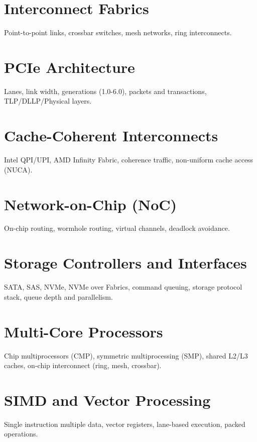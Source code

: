 \chapter{Interconnect Fabrics}
Point-to-point links, crossbar switches, mesh networks, ring interconnects.

\chapter{PCIe Architecture}
Lanes, link width, generations (1.0-6.0), packets and transactions, TLP/DLLP/Physical layers.

\chapter{Cache-Coherent Interconnects}
Intel QPI/UPI, AMD Infinity Fabric, coherence traffic, non-uniform cache access (NUCA).

\chapter{Network-on-Chip (NoC)}
On-chip routing, wormhole routing, virtual channels, deadlock avoidance.

\chapter{Storage Controllers and Interfaces}
SATA, SAS, NVMe, NVMe over Fabrics, command queuing, storage protocol stack, queue depth and parallelism.


\chapter{Multi-Core Processors}
Chip multiprocessors (CMP), symmetric multiprocessing (SMP), shared L2/L3 caches, on-chip interconnect (ring, mesh, crossbar).

\chapter{SIMD and Vector Processing}
Single instruction multiple data, vector registers, lane-based execution, packed operations.

